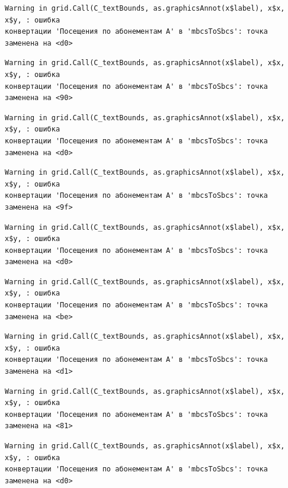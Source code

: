 \documentclass[
  letterpaper,
  DIV=11,
  numbers=noendperiod]{scrreprt}
\begin{document}
\begin{verbatim}
Warning in grid.Call(C_textBounds, as.graphicsAnnot(x$label), x$x, x$y, : ошибка
конвертации 'Посещения по абонементам А' в 'mbcsToSbcs': точка заменена на <d0>
\end{verbatim}

\begin{verbatim}
Warning in grid.Call(C_textBounds, as.graphicsAnnot(x$label), x$x, x$y, : ошибка
конвертации 'Посещения по абонементам А' в 'mbcsToSbcs': точка заменена на <90>
\end{verbatim}

\begin{verbatim}
Warning in grid.Call(C_textBounds, as.graphicsAnnot(x$label), x$x, x$y, : ошибка
конвертации 'Посещения по абонементам А' в 'mbcsToSbcs': точка заменена на <d0>
\end{verbatim}

\begin{verbatim}
Warning in grid.Call(C_textBounds, as.graphicsAnnot(x$label), x$x, x$y, : ошибка
конвертации 'Посещения по абонементам А' в 'mbcsToSbcs': точка заменена на <9f>
\end{verbatim}

\begin{verbatim}
Warning in grid.Call(C_textBounds, as.graphicsAnnot(x$label), x$x, x$y, : ошибка
конвертации 'Посещения по абонементам А' в 'mbcsToSbcs': точка заменена на <d0>
\end{verbatim}

\begin{verbatim}
Warning in grid.Call(C_textBounds, as.graphicsAnnot(x$label), x$x, x$y, : ошибка
конвертации 'Посещения по абонементам А' в 'mbcsToSbcs': точка заменена на <be>
\end{verbatim}

\begin{verbatim}
Warning in grid.Call(C_textBounds, as.graphicsAnnot(x$label), x$x, x$y, : ошибка
конвертации 'Посещения по абонементам А' в 'mbcsToSbcs': точка заменена на <d1>
\end{verbatim}

\begin{verbatim}
Warning in grid.Call(C_textBounds, as.graphicsAnnot(x$label), x$x, x$y, : ошибка
конвертации 'Посещения по абонементам А' в 'mbcsToSbcs': точка заменена на <81>
\end{verbatim}

\begin{verbatim}
Warning in grid.Call(C_textBounds, as.graphicsAnnot(x$label), x$x, x$y, : ошибка
конвертации 'Посещения по абонементам А' в 'mbcsToSbcs': точка заменена на <d0>
\end{verbatim}
\end{document}
